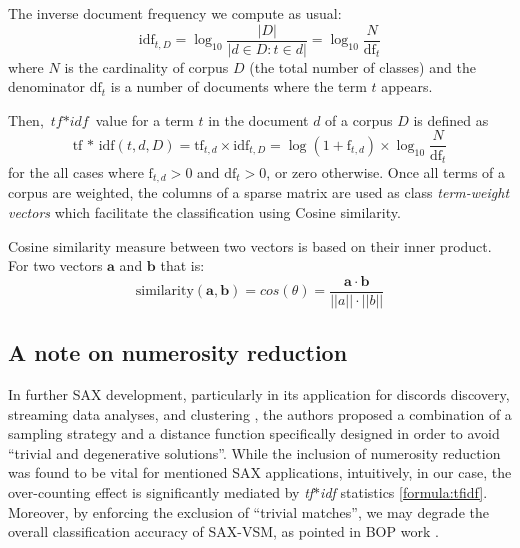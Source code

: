 \documentclass{llncs}
\begin{document}
The inverse document frequency we compute as usual:
\begin{equation}
 \mbox{idf}_{t, D} =  \log_{10}\frac{|D|}{|d \in D : t \in d|} = \log_{10}\frac{N}{\mbox{df}_{t}}
\end{equation} 
where $N$ is the cardinality of corpus $D$ (the total number of classes) and the 
denominator $\mbox{df}_{t}$ is a number of documents where the term $t$ appears.

Then, $\textit{tf$\ast$idf}$ value for a term $t$ in the document $d$ of a corpus $D$ is defined as 
\begin{equation}
 \mbox{tf * idf}(t, d, D) =  \mbox{tf}_{t, d} \times \mbox{idf}_{t, D} = \log(1 + \mbox{f}_{t,d})
\times \log_{10}\frac{N}{\mbox{df}_{t}}
 \label{formula:tfidf}
\end{equation} 
for the all cases where $\mbox{f}_{t,d}>0$ and $\mbox{df}_{t}>0$, or zero otherwise.
Once all terms of a corpus are weighted, the columns of a sparse matrix are used 
as class \textit{term-weight vectors} which facilitate the classification using Cosine similarity. 

\enlargethispage{0.5cm} 
Cosine similarity measure between two vectors is based on their inner product. 
For two vectors $\boldsymbol{a}$ and $\boldsymbol{b}$ that is:
\begin{equation}
\mbox{similarity}(\boldsymbol{a},\boldsymbol{b}) = cos(\theta) = \frac{ 
\mathbf{a} \cdot \mathbf{b} } {\left| \left| a \right| \right| \cdot \left| \left| b \right|
\right|}
\end{equation} 

\subsection{A note on numerosity reduction}
In further SAX development, particularly in its application for discords discovery,
streaming data analyses, and clustering \cite{hot_sax} \cite{streaming_sax}, the authors 
proposed a combination of a sampling strategy and a distance function specifically 
designed in order to avoid ``trivial and degenerative solutions''. While the inclusion of
numerosity reduction was found to be vital for mentioned SAX applications, intuitively, 
in our case, the over-counting effect is significantly mediated by \textit{tf$\ast$idf}
statistics \eqref{formula:tfidf}. Moreover, by enforcing the exclusion of ``trivial matches'', we
may degrade the overall classification accuracy of SAX-VSM, as pointed in 
BOP work \cite{bag_patterns}.
\end{document}
